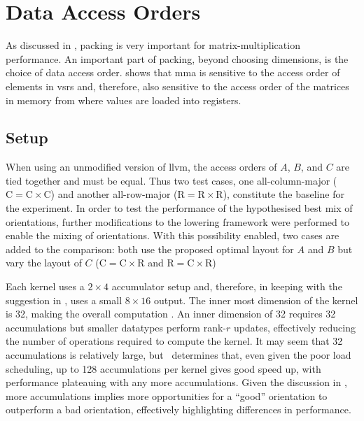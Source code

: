 \documentclass[\main/thesis.tex]{subfiles}
\begin{document}
\section{Data Access Orders}
\label{sec:variedOrders}
As discussed in , packing is very important for matrix-multiplication performance.
An important part of packing, beyond choosing dimensions, is the choice of data access order.
 shows that \gls{mma} is sensitive to the access order of elements in \glspl{vsr} and, therefore, also sensitive to the access order of the matrices in memory from where values are loaded into registers.

\subsection{Setup}
When using an unmodified version of \gls{llvm}, the access orders of $A$, $B$, and $C$ are tied together and must be equal.
Thus two test cases, one all-column-major ($\textrm{C} = \textrm{C} \times \textrm{C}$) and another all-row-major ($\textrm{R} = \textrm{R} \times \textrm{R}$), constitute the baseline for the experiment.
In order to test the performance of the hypothesised best mix of orientations, further modifications to the lowering framework were performed to enable the mixing of orientations.
With this possibility enabled, two cases are added to the comparison: both use the proposed optimal layout for $A$ and $B$ but vary the layout of $C$ ($\textrm{C} = \textrm{C} \times \textrm{R}$ and $\textrm{R} = \textrm{C} \times \textrm{R}$)

Each kernel uses a $2 \times 4$ accumulator setup and, therefore, in keeping with the suggestion in , uses a small $8 \times 16$ output.
The inner most dimension of the kernel is 32, making the overall computation .
An inner dimension of 32 requires 32 accumulations but smaller datatypes perform rank-$r$ updates, effectively reducing the number of operations required to compute the kernel.
It may seem that 32 accumulations is relatively large, but~\autocite{kuzma2021fast} determines that, even given the poor load scheduling, up to 128 accumulations per kernel gives good speed up, with performance plateauing with any more accumulations.
Given the discussion in , more accumulations implies more opportunities for a ``good'' orientation to outperform a bad orientation, effectively highlighting differences in performance.
\end{document}
